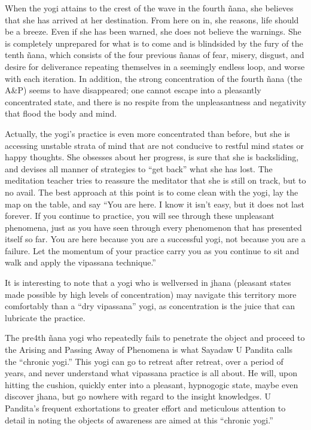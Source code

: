 \documentclass[a5paper,10pt,english]{book}
\begin{document}
\sphinxAtStartPar
When the yogi attains to the crest of the wave in the fourth ñana, she
believes that she has arrived at her destination. From here on in, she
reasons, life should be a breeze. Even if she has been warned, she does
not believe the warnings. She is completely unprepared for what is to
come and is blindsided by the fury of the tenth ñana, which consists of
the four previous ñanas of fear, misery, disgust, and desire for
deliverance repeating themselves in a seemingly endless loop, and worse
with each iteration. In addition, the strong concentration of the fourth
ñana (the A\&P) seems to have disappeared; one cannot escape into a
pleasantly concentrated state, and there is no respite from the
unpleasantness and negativity that flood the body and mind.

\sphinxAtStartPar
Actually, the yogi’s practice is even more concentrated than before, but
she is accessing unstable strata of mind that are not conducive to
restful mind states or happy thoughts. She obsesses about her progress,
is sure that she is back\sphinxhyphen{}sliding, and devises all manner of strategies
to “get back” what she has lost. The meditation teacher tries to
reassure the meditator that she is still on track, but to no avail. The
best approach at this point is to come clean with the yogi, lay the map
on the table, and say “You are here. I know it isn’t easy, but it does
not last forever. If you continue to practice, you will see through
these unpleasant phenomena, just as you have seen through every
phenomenon that has presented itself so far. You are here because you
are a successful yogi, not because you are a failure. Let the momentum
of your practice carry you as you continue to sit and walk and apply the
vipassana technique.”

\sphinxAtStartPar
It is interesting to note that a yogi who is well\sphinxhyphen{}versed in jhana
(pleasant states made possible by high levels of concentration) may
navigate this territory more comfortably than a “dry vipassana” yogi, as
concentration is the juice that can lubricate the practice.

\sphinxAtStartPar
The pre\sphinxhyphen{}4th ñana yogi who repeatedly fails to penetrate the object and
proceed to the Arising and Passing Away of Phenomena is what Sayadaw U
Pandita calls the “chronic yogi.” This yogi can go to retreat after
retreat, over a period of years, and never understand what vipassana
practice is all about. He will, upon hitting the cushion, quickly enter
into a pleasant, hypnogogic state, maybe even discover jhana, but go
nowhere with regard to the insight knowledges. U Pandita’s frequent
exhortations to greater effort and meticulous attention to detail in
noting the objects of awareness are aimed at this “chronic yogi.”
\end{document}
